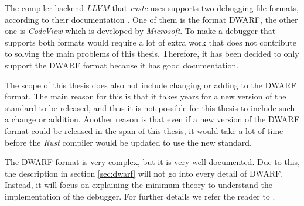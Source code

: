 %



The compiler backend \emph{LLVM} that \emph{rustc} uses supports two debugging file formats, according to their documentation \cite{llvm-dbs}.
One of them is the format \gls{DWARF}, the other one is \emph{CodeView} which is developed by \emph{Microsoft}.
To make a debugger that supports both formats would require a lot of extra work that does not contribute to solving the main problems of this thesis.
Therefore, it has been decided to only support the \gls{DWARF} format because it has good documentation.


The scope of this thesis does also not include changing or adding to the \gls{DWARF} format.
The main reason for this is that it takes years for a new version of the standard to be released, and thus it is not possible for this thesis to include such a change or addition.
Another reason is that even if a new version of the \gls{DWARF} format could be released in the span of this thesis, it would take a lot of time before the \emph{Rust} compiler would be updated to use the new standard.


The \gls{DWARF} format is very complex, but it is very well documented.
Due to this, the description in section \ref{sec:dwarf} will not go into every detail of \gls{DWARF}.
Instead, it will focus on explaining the minimum theory to understand the implementation of the debugger.
For further details we refer the reader to \cite{dwarf}.


